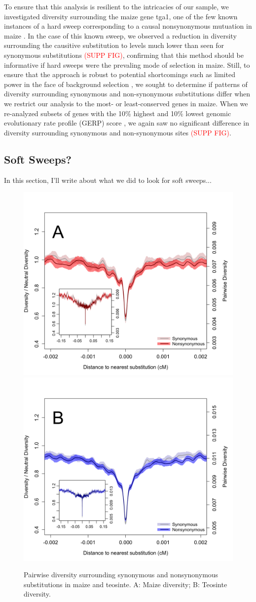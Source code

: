 \documentclass{pnastwo}
\begin{document}
\begin{article}
To ensure that this analysis is resilient to the intricacies of our sample, we investigated diversity surrounding the maize gene tga1, one of the few known instances of a hard sweep corresponding to a causal nonsynonymous mutuation in maize \cite{wang2015}. In the case of this known sweep, we observed a reduction in diversity surrounding the causitive substitution to levels much lower than seen for synonymous substitutions \textcolor{red}{(SUPP FIG)}, confirming that this method should be informative if hard sweeps were the prevaling mode of selection in maize. Still, to ensure that the approach is robust to potential shortcomings such as limited power in the face of background selection \cite{enard2014}, we sought to determine if patterns of diversity surrounding synonymous and non-synonymous substitutions differ when we restrict our analysis to the most- or least-conserved genes in maize. When we re-analyzed subsets of genes with the 10\% highest and 10\% lowest genomic evolutionary rate profile (GERP) score \cite{davydov2010, cooper2005, rodgers2015}, we again saw no significant difference in diversity surrounding synonymous and non-synonymous sites \textcolor{red}{(SUPP FIG)}.

\subsection{Soft Sweeps?}
In this section, I'll write about what we did to look for soft sweeps...

\begin{figure}[b]
\centering
\includegraphics[width=.45\textwidth]{FigsAndFiles/plotDiversity_TvM_Folded2_Significance_June}
\hspace{0.05\textwidth} \includegraphics[width=.45\textwidth]{FigsAndFiles/plotDiversity_TvT_Folded2_Significance_June}
\caption{Pairwise diversity surrounding synonymous and nonsynonymous
  substitutions in maize and teosinte. A: Maize diversity; B: Teosinte
diversity. \label{fig:hardSweeps}}
\end{figure}


\end{article}
\end{document}

